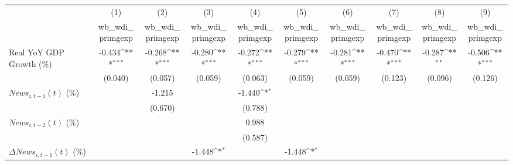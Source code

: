 {
\def\sym#1{\ifmmode^{#1}\else\(^{#1}\)\fi}
\begin{tabular}{l*{9}{c}}
\toprule
                    &\multicolumn{1}{c}{(1)}&\multicolumn{1}{c}{(2)}&\multicolumn{1}{c}{(3)}&\multicolumn{1}{c}{(4)}&\multicolumn{1}{c}{(5)}&\multicolumn{1}{c}{(6)}&\multicolumn{1}{c}{(7)}&\multicolumn{1}{c}{(8)}&\multicolumn{1}{c}{(9)}\\
                    &\multicolumn{1}{c}{wb_wdi_primgexp}&\multicolumn{1}{c}{wb_wdi_primgexp}&\multicolumn{1}{c}{wb_wdi_primgexp}&\multicolumn{1}{c}{wb_wdi_primgexp}&\multicolumn{1}{c}{wb_wdi_primgexp}&\multicolumn{1}{c}{wb_wdi_primgexp}&\multicolumn{1}{c}{wb_wdi_primgexp}&\multicolumn{1}{c}{wb_wdi_primgexp}&\multicolumn{1}{c}{wb_wdi_primgexp}\\
\midrule
Real YoY GDP Growth (\%)&      -0.434\sym{***}&      -0.268\sym{***}&      -0.280\sym{***}&      -0.272\sym{***}&      -0.279\sym{***}&      -0.281\sym{***}&      -0.470\sym{***}&      -0.287\sym{**} &      -0.506\sym{***}\\
                    &     (0.040)         &     (0.057)         &     (0.059)         &     (0.063)         &     (0.059)         &     (0.059)         &     (0.123)         &     (0.096)         &     (0.126)         \\
\addlinespace
$ News_{i,t-1}(t)$ (\%)&                     &      -1.215         &                     &      -1.440\sym{*}  &                     &                     &                     &                     &                     \\
                    &                     &     (0.670)         &                     &     (0.788)         &                     &                     &                     &                     &                     \\
\addlinespace
$ News_{i,t-2}(t)$ (\%)&                     &                     &                     &       0.988         &                     &                     &                     &                     &                     \\
                    &                     &                     &                     &     (0.587)         &                     &                     &                     &                     &                     \\
\addlinespace
$ \Delta News_{i,t-1}(t)$ (\%)&                     &                     &      -1.448\sym{*}  &                     &      -1.448\sym{*}  &                     &                     &                     &                     \\

\end{tabular}}
